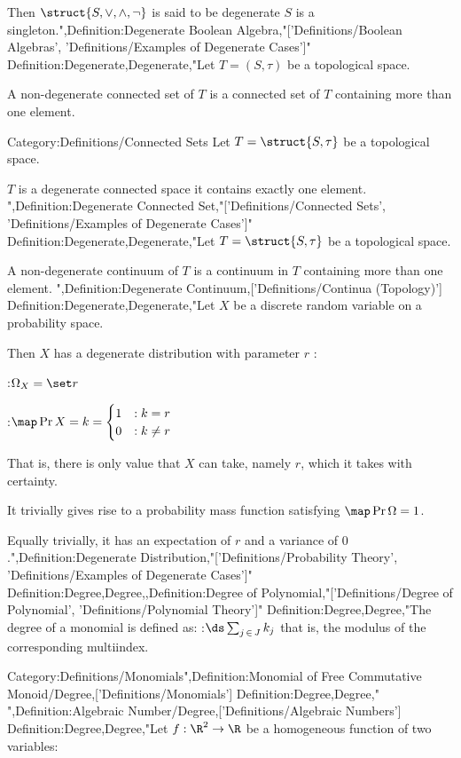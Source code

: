 Then $\struct {S, \vee, \wedge, \neg}$ is said to be degenerate  $S$ is a singleton.",Definition:Degenerate Boolean Algebra,"['Definitions/Boolean Algebras', 'Definitions/Examples of Degenerate Cases']"
Definition:Degenerate,Degenerate,"Let $T = \left({S, \tau}\right)$ be a topological space.


A non-degenerate connected set of $T$ is a connected set of $T$ containing more than one element.


Category:Definitions/Connected Sets
Let $T = \struct {S, \tau}$ be a topological space.


$T$ is a degenerate connected space  it contains exactly one element.
",Definition:Degenerate Connected Set,"['Definitions/Connected Sets', 'Definitions/Examples of Degenerate Cases']"
Definition:Degenerate,Degenerate,"Let $T = \struct {S, \tau}$ be a topological space.


A non-degenerate continuum of $T$ is a continuum in $T$ containing more than one element.
",Definition:Degenerate Continuum,['Definitions/Continua (Topology)']
Definition:Degenerate,Degenerate,"Let $X$ be a discrete random variable on a probability space.


Then $X$ has a degenerate distribution with parameter $r$ :

:$\Omega_X = \set r$

:$\map \Pr {X = k} = \begin {cases}
1 & : k = r \\
0 & : k \ne r
\end {cases}$

That is, there is only value that $X$ can take, namely $r$, which it takes with certainty.




It trivially gives rise to a probability mass function satisfying $\map \Pr \Omega = 1$.

Equally trivially, it has an expectation of $r$ and a variance of $0$.",Definition:Degenerate Distribution,"['Definitions/Probability Theory', 'Definitions/Examples of Degenerate Cases']"
Definition:Degree,Degree,,Definition:Degree of Polynomial,"['Definitions/Degree of Polynomial', 'Definitions/Polynomial Theory']"
Definition:Degree,Degree,"The degree of a monomial is defined as:
:$\ds \sum_{j \mathop \in J} k_j$
that is, the modulus of the corresponding multiindex.


Category:Definitions/Monomials",Definition:Monomial of Free Commutative Monoid/Degree,['Definitions/Monomials']
Definition:Degree,Degree,"
",Definition:Algebraic Number/Degree,['Definitions/Algebraic Numbers']
Definition:Degree,Degree,"Let $f: \R^2 \to \R$ be a homogeneous function of two variables:


